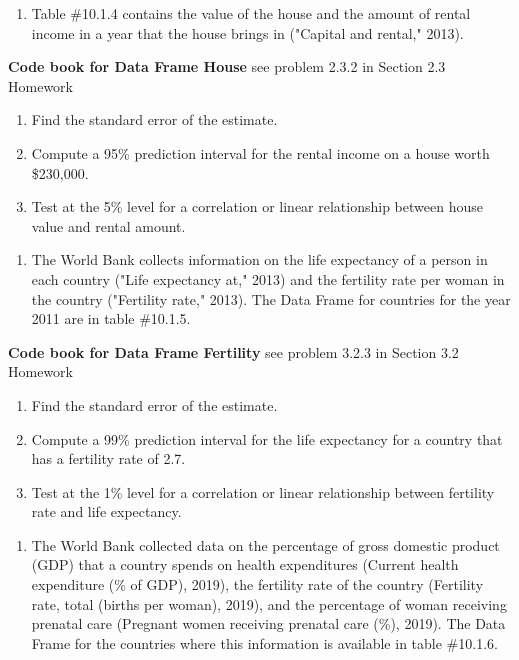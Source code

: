 \documentclass[
]{book}
\providecommand{\tightlist}{%
  \setlength{\itemsep}{0pt}\setlength{\parskip}{0pt}}
\begin{document}
\begin{enumerate}
\def\labelenumi{\arabic{enumi}.}
\setcounter{enumi}{1}
\tightlist
\item
  Table \#10.1.4 contains the value of the house and the amount of rental income in a year that the house brings in ("Capital and rental," 2013).
\end{enumerate}

\textbf{Code book for Data Frame House} see problem 2.3.2 in Section 2.3 Homework

\begin{enumerate}
\def\labelenumi{\alph{enumi}.}
\tightlist
\item
  Find the standard error of the estimate.
\item
  Compute a 95\% prediction interval for the rental income on a house worth \$230,000.
\item
  Test at the 5\% level for a correlation or linear relationship between house value and rental amount.
\end{enumerate}

\begin{enumerate}
\def\labelenumi{\arabic{enumi}.}
\setcounter{enumi}{2}
\tightlist
\item
  The World Bank collects information on the life expectancy of a person in each country ("Life expectancy at," 2013) and the fertility rate per woman in the country ("Fertility rate," 2013). The Data Frame for countries for the year 2011 are in table \#10.1.5.
\end{enumerate}

\textbf{Code book for Data Frame Fertility} see problem 3.2.3 in Section 3.2 Homework

\begin{enumerate}
\def\labelenumi{\alph{enumi}.}
\tightlist
\item
  Find the standard error of the estimate.
\item
  Compute a 99\% prediction interval for the life expectancy for a country that has a fertility rate of 2.7.
\item
  Test at the 1\% level for a correlation or linear relationship between fertility rate and life expectancy.
\end{enumerate}

\begin{enumerate}
\def\labelenumi{\arabic{enumi}.}
\setcounter{enumi}{3}
\tightlist
\item
  The World Bank collected data on the percentage of gross domestic product (GDP) that a country spends on health expenditures (Current health expenditure (\% of GDP), 2019), the fertility rate of the country (Fertility rate, total (births per woman), 2019), and the percentage of woman receiving prenatal care (Pregnant women receiving prenatal care (\%), 2019). The Data Frame for the countries where this information is available in table \#10.1.6.
\end{enumerate}
\end{document}
